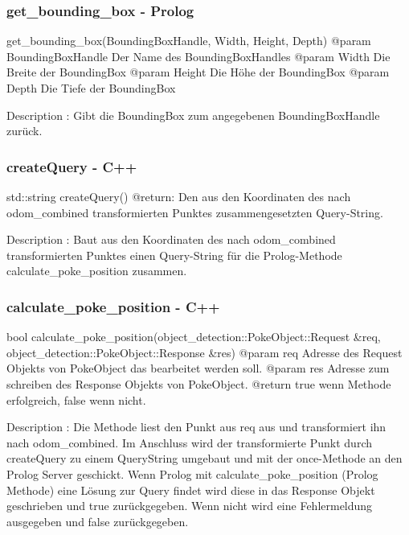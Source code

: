 \documentclass{suturo}
\begin{document}
\subsubsection{get\_bounding\_box - Prolog}
\begin{spverbatim}
get_bounding_box(BoundingBoxHandle, Width, Height, Depth)
@param BoundingBoxHandle Der Name des BoundingBoxHandles
@param Width             Die Breite der BoundingBox
@param Height            Die Höhe der BoundingBox
@param Depth             Die Tiefe der BoundingBox

Description : Gibt die BoundingBox zum angegebenen BoundingBoxHandle zurück.
\end{spverbatim}

\subsubsection{createQuery - C++}
\begin{spverbatim}
std::string createQuery()
@return: Den aus den Koordinaten des nach odom_combined transformierten 
Punktes zusammengesetzten Query-String.

Description : Baut aus den Koordinaten des nach odom_combined transformierten Punktes einen Query-String für die Prolog-Methode calculate_poke_position zusammen.
\end{spverbatim}

\subsubsection{calculate\_poke\_position - C++}
\begin{spverbatim}
bool calculate_poke_position(object_detection::PokeObject::Request  &req, 
                             object_detection::PokeObject::Response &res)
@param req Adresse des Request Objekts von PokeObject das bearbeitet werden soll.
@param res Adresse zum schreiben des Response Objekts von PokeObject.
@return true wenn Methode erfolgreich, false wenn nicht.

Description : Die Methode liest den Punkt aus req aus und transformiert ihn nach odom_combined. Im Anschluss wird der transformierte Punkt durch createQuery zu einem QueryString umgebaut und mit der once-Methode an den Prolog Server geschickt. Wenn Prolog mit calculate_poke_position (Prolog Methode) eine Lösung zur Query findet wird diese in das Response Objekt geschrieben und true zurückgegeben. Wenn nicht wird eine Fehlermeldung ausgegeben und false zurückgegeben.
\end{spverbatim}
\end{document}
